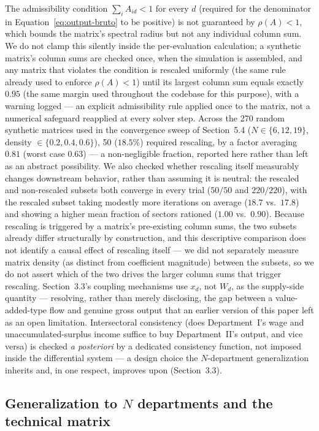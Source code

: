 \documentclass[11pt]{article}
\begin{document}
The admissibility condition $\sum_iA_{id}<1$ for every $d$ (required for
the denominator in Equation~\eqref{eq:output-bruto} to be positive) is
not guaranteed by $\rho(A)<1$, which bounds the matrix's spectral radius
but not any individual column sum. We do not clamp this silently inside
the per-evaluation calculation; a synthetic matrix's column sums are
checked once, when the simulation is assembled, and any matrix that
violates the condition is rescaled uniformly (the same rule already used
to enforce $\rho(A)<1$) until its largest column sum equals exactly
$0.95$ (the same margin used throughout the codebase for this purpose),
with a warning logged --- an explicit admissibility rule applied
once to the matrix, not a numerical safeguard reapplied at every solver
step. Across the 270 random synthetic matrices used in the convergence
sweep of Section~5.4 ($N\in\{6,12,19\}$, density $\in\{0.2,0.4,0.6\}$),
50 ($18.5\%$) required rescaling, by a factor averaging $0.81$ (worst
case $0.63$) --- a non-negligible fraction, reported here rather than
left as an abstract possibility. We also checked whether rescaling
itself measurably changes downstream behavior, rather than assuming it
is neutral: the rescaled and non-rescaled subsets both converge in every
trial ($50/50$ and $220/220$), with the rescaled subset taking modestly
more iterations on average ($18.7$ vs.\ $17.8$) and showing a higher
mean fraction of sectors rationed ($1.00$ vs.\ $0.90$). Because
rescaling is triggered by a matrix's pre-existing column sums, the two
subsets already differ structurally by construction, and this
descriptive comparison does not identify a causal effect of rescaling
itself --- we did not separately measure matrix density (as distinct
from coefficient magnitude) between the subsets, so we do not assert
which of the two drives the larger column sums that trigger rescaling.
Section~3.3's coupling mechanisms use
$x_d$, not $W_d$, as the supply-side quantity --- resolving, rather than
merely disclosing, the gap between a value-added-type flow and genuine
gross output that an earlier version of this paper left as an open
limitation. Intersectoral
consistency (does Department~I's wage and unaccumulated-surplus income
suffice to buy Department~II's output, and vice versa) is checked
\emph{a posteriori} by a dedicated consistency function, not imposed
inside the differential system --- a design choice the $N$-department
generalization inherits and, in one respect, improves upon
(Section~3.3).

\subsection{Generalization to $N$ departments and the technical matrix}
\end{document}
